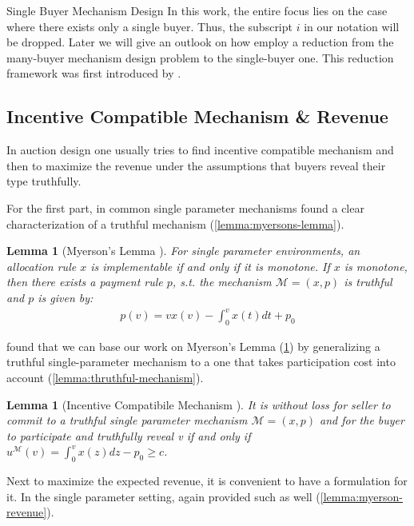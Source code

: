 \documentclass[11pt,a4paper]{article}
\newtheorem{lemma}[theorem]{Lemma}
\newcommand{\1}[1]{\mbox{\rm\bf 1}_{#1}}
\begin{document}
\begin{section}{Single Buyer Mechanism Design}
 In this work, the entire focus lies on the case where there exists only a single buyer.
 Thus, the subscript $i$ in our notation will be dropped.
 Later we will give an outlook on how \citet{primary} employ a reduction from the many-buyer mechanism design problem to the single-buyer one.
 This reduction framework was first introduced by \citet{alaei2012bayesian,alaei2014bayesian}.

 \subsection{Incentive Compatible Mechanism \& Revenue}
 \label{sec:incentive-comptaible-mechanism-revenue}
 In auction design one usually tries to find incentive compatible mechanism and then to maximize the revenue under the assumptions that buyers reveal their type truthfully.

 For the first part, in common single parameter mechanisms \citet{myerson} found a clear characterization of a truthful mechanism (\autoref{lemma:myersons-lemma}).

 \begin{lemma}[Myerson's Lemma \cite{myerson}]
     \label{lemma:myersons-lemma}
     For single parameter environments, an allocation rule $x$ is implementable if and only if it is monotone.
     If $x$ is monotone, then there exists a payment rule $p$, s.t. the mechanism $\mathcal{M}=(x,p)$ is truthful
     and $p$ is given by:
     \begin{align*}
         p(v) = v x(v) - \int_0^v x(t) dt + p_0
     \end{align*}
 \end{lemma}

 \citet{primary} found that we can base our work on Myerson's Lemma (\ref{lemma:myersons-lemma})
 by generalizing a truthful single-parameter mechanism to a one that takes participation cost into account (\autoref{lemma:thruthful-mechanism}).

 \begin{lemma}[Incentive Compatibile Mechanism \cite{primary}]
     \label{lemma:thruthful-mechanism}
     It is without loss for seller to commit to a truthful single parameter mechanism $\mathcal{M}=(x,p)$ and
     for the buyer to participate and truthfully reveal v if and only if $u^\mathcal{M}(v) = \int_0^v x(z)dz - p_0 \geq c$.
 \end{lemma}

 Next to maximize the expected revenue, it is convenient to have a formulation for it.
 In the single parameter setting, again \citet{myerson} provided such as well (\autoref{lemma:myerson-revenue}).


\end{section}
\end{document}
